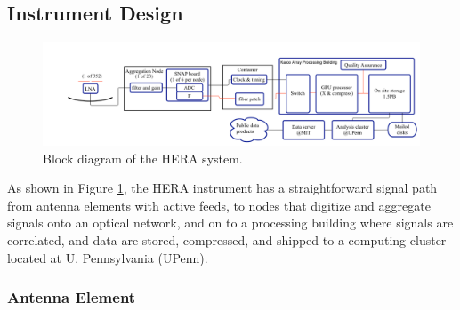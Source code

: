 \documentclass[preprint]{aastex}
\newcommand{\compress}{\vspace{-0.3in}}
\newcommand{\Caption}[4]{\vspace{#1}\renewcommand{\baselinestretch}{#2}\caption{#4}\vspace{#3}}
\begin{document}
\compress
\subsection{Instrument Design}
\label{InstDes}
%
%

\begin{figure}[t]
\centering
\includegraphics[width=\textwidth]{plots/Engineering/HERA_high_level_block_diagram.png}
\Caption{-0.75in}{0.9}{0in}{\small
Block diagram of the HERA system.}
\label{fig:blockDiagram} 
\end{figure}

As shown in Figure \ref{fig:blockDiagram}, the HERA instrument has a straightforward signal
path from antenna elements
with active feeds, to nodes that digitize and aggregate signals onto an optical network,
and on to a processing building where signals are correlated, and data are stored, compressed,
and shipped to a computing cluster located at U. Pennsylvania (UPenn). 

\compress
\subsubsection{Antenna Element}
\end{document}
